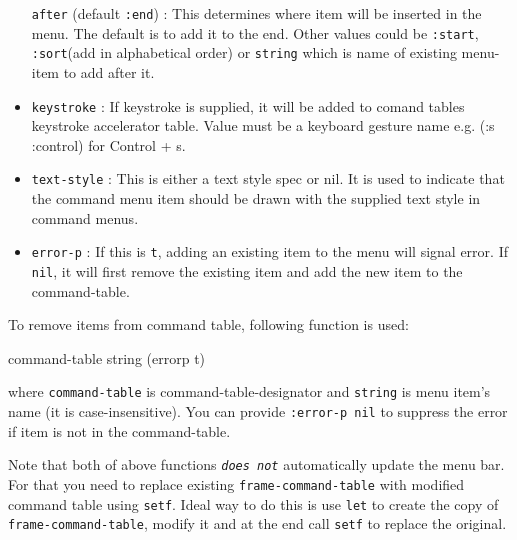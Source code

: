 \begin{itemize}
  \texttt{after} (default \texttt{:end}) : This determines where item
  will be inserted in the menu. The default is to add it to the
  end. Other values could be \texttt{:start}, \texttt{:sort}(add in
  alphabetical order) or \texttt{string} which is name of existing
  menu-item to add after it.
\item
  \texttt{keystroke} : If keystroke is supplied, it will be added to
  comand tables keystroke accelerator table. Value must be a keyboard
  gesture name e.g. (:s :control) for Control + s.
\item
  \texttt{text-style} : This is either a text style spec or nil. It is
  used to indicate that the command menu item should be drawn with the
  supplied text style in command menus.
\item
  \texttt{error-p} : If this is \texttt{t}, adding an existing item to
  the menu will signal error. If \texttt{nil}, it will first remove
  the existing item and add the new item to the command-table.
\end{itemize}

To remove items from command table, following function is used:

 {command-table string \key (errorp t)}

where \texttt{command-table} is command-table-designator and
\texttt{string} is menu item's name (it is case-insensitive). You can
provide \texttt{:error-p nil} to suppress the error if item is not in
the command-table.

Note that both of above functions \texttt{\emph{does not}}
automatically update the menu bar. For that you need to replace
existing \texttt{frame-command-table} with modified command table
using \texttt{setf}. Ideal way to do this is use \texttt{let} to
create the copy of \texttt{frame-command-table}, modify it and at the
end call \texttt{setf} to replace the original.





